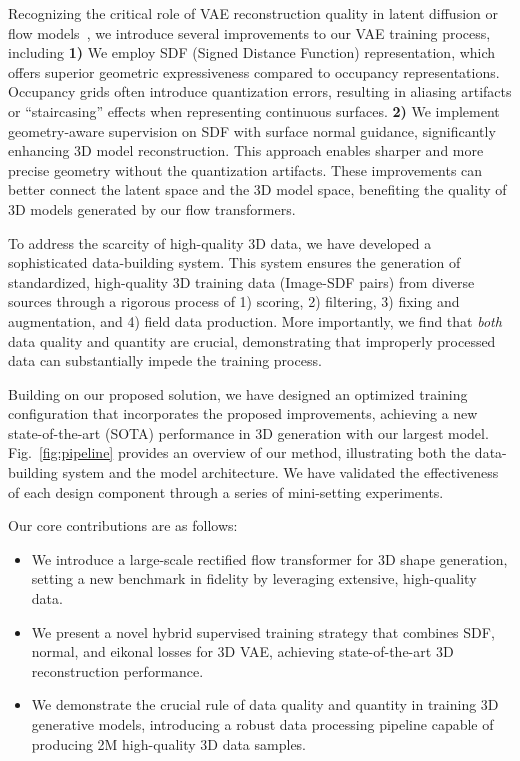Recognizing the critical role of VAE reconstruction quality in latent diffusion or flow models~\cite{rombach2022high,zhang20233dshape2vecset}, we introduce several improvements to our VAE training process, including \textbf{1)} We employ SDF (Signed Distance Function) representation, which offers superior geometric expressiveness compared to occupancy representations. Occupancy grids often introduce quantization errors, resulting in aliasing artifacts or ``staircasing'' effects when representing continuous surfaces. \textbf{2)} We implement geometry-aware supervision on SDF with surface normal guidance, significantly enhancing 3D model reconstruction. This approach enables sharper and more precise geometry without the quantization artifacts.
These improvements can better connect the latent space and the 3D model space, benefiting the quality of 3D models generated by our flow transformers.

To address the scarcity of high-quality 3D data, we have developed a sophisticated data-building system. This system ensures the generation of standardized, high-quality 3D training data (Image-SDF pairs) from diverse sources through a rigorous process of 1) scoring, 2) filtering, 3) fixing and augmentation, and 4) field data production.
More importantly, we find that \emph{both} data quality and quantity are crucial, demonstrating that improperly processed data can substantially impede the training process.


Building on our proposed solution, we have designed an optimized training configuration that incorporates the proposed improvements, achieving a new state-of-the-art (SOTA) performance in 3D generation with our largest \method{} model.
Fig.~\ref{fig:pipeline} provides an overview of our method, illustrating both the data-building system and the \method{} model architecture. 
We have validated the effectiveness of each design component through a series of mini-setting experiments.

Our core contributions are as follows:


\begin{itemize}
    \item We introduce a large-scale rectified flow transformer for 3D shape generation, setting a new benchmark in fidelity by leveraging extensive, high-quality data.
    \item We present a novel hybrid supervised training strategy that combines SDF, normal, and eikonal losses for 3D VAE, achieving state-of-the-art 3D reconstruction performance.
    \item We demonstrate the crucial rule of data quality and quantity in training 3D generative models, introducing a robust data processing pipeline capable of producing 2M high-quality 3D data samples.
\end{itemize}